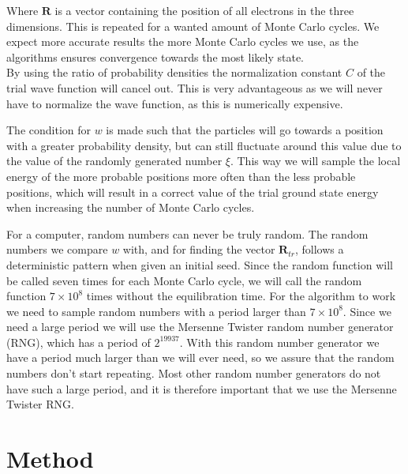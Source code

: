 \documentclass[%
 reprint,
nofootinbib,
aps,
]{revtex4-1}
\begin{document}
Where $\bm{R}$ is a vector containing the position of all electrons in the three dimensions. This is repeated for a wanted amount of Monte Carlo cycles. We expect more accurate results the more Monte Carlo cycles we use, as the algorithms ensures convergence towards the most likely state.\\
By using the ratio of probability densities the normalization constant $C$ of the trial wave function will cancel out. This is very advantageous as we will never have to normalize the wave function, as this is numerically expensive.\par
The condition for $w$ is made such that the particles will go towards a position with a greater probability density, but can still fluctuate around this value due to the value of the randomly generated number $\xi$. This way we will sample the local energy of the more probable positions more often than the less probable positions, which will result in a correct value of the trial ground state energy when increasing the number of Monte Carlo cycles.\par
For a computer, random numbers can never be truly random. The random numbers we compare $w$ with, and for finding the vector $\bm{R}_{tr}$, follows a deterministic pattern when given an initial seed. Since the random function will be called seven times for each Monte Carlo cycle, we will call the random function $7\times 10^{8}$ times without the equilibration time. For the algorithm to work we need to sample random numbers with a period larger than $7\times 10^{8}$. Since we need a large period we will use the Mersenne Twister random number generator (RNG), which has a period of $2^{19937}$. With this random number generator we have a period much larger than we will ever need, so we assure that the random numbers don't start repeating. Most other random number generators do not have such a large period, and it is therefore important that we use the Mersenne Twister RNG.

\section{Method}
\end{document}
